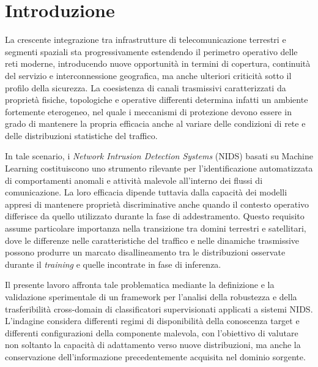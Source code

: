 
\chapter{Introduzione}
\label{ch:introduzione}

La crescente integrazione tra infrastrutture di telecomunicazione terrestri e segmenti spaziali sta progressivamente estendendo il perimetro operativo delle reti moderne, introducendo nuove opportunità in termini di copertura, continuità del servizio e interconnessione geografica, ma anche ulteriori criticità sotto il profilo della sicurezza. 
La coesistenza di canali trasmissivi caratterizzati da proprietà fisiche, topologiche e operative differenti determina infatti un ambiente fortemente eterogeneo, nel quale i meccanismi di protezione devono essere in grado di mantenere la propria efficacia anche al variare delle condizioni di rete e delle distribuzioni statistiche del traffico.

In tale scenario, i \textit{Network Intrusion Detection Systems} (NIDS) basati su Machine Learning costituiscono uno strumento rilevante per l'identificazione automatizzata di comportamenti anomali e attività malevole all'interno dei flussi di comunicazione. 
La loro efficacia dipende tuttavia dalla capacità dei modelli appresi di mantenere proprietà discriminative anche quando il contesto operativo differisce da quello utilizzato durante la fase di addestramento. 
Questo requisito assume particolare importanza nella transizione tra domini terrestri e satellitari, dove le differenze nelle caratteristiche del traffico e nelle dinamiche trasmissive possono produrre un marcato disallineamento tra le distribuzioni osservate durante il \textit{training} e quelle incontrate in fase di inferenza.

Il presente lavoro affronta tale problematica mediante la definizione e la validazione sperimentale di un framework per l'analisi della robustezza e della trasferibilità cross-domain di classificatori supervisionati applicati a sistemi NIDS. 
L'indagine considera differenti regimi di disponibilità della conoscenza target e differenti configurazioni della componente malevola, con l'obiettivo di valutare non soltanto la capacità di adattamento verso nuove distribuzioni, ma anche la conservazione dell'informazione precedentemente acquisita nel dominio sorgente.


